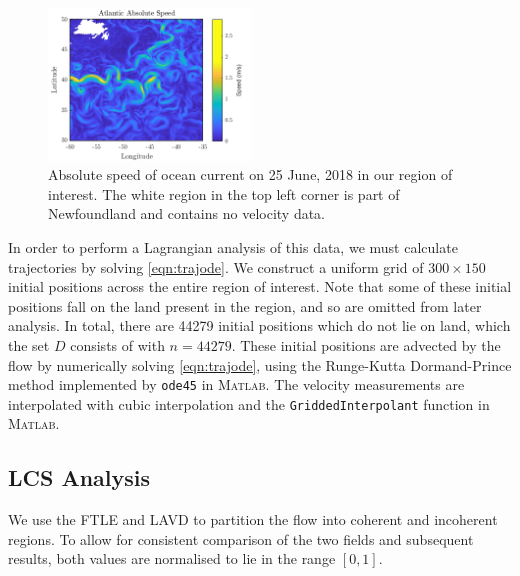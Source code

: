 \documentclass[a4paper, fontsize=12pt]{article}
\begin{document}
\clearpage
\begin{figure}
\begin{center}
	\includegraphics[width=0.48\textwidth]{../figures/atlantic_speed_ff.png}%
	\caption{Absolute speed of ocean current on 25 June, 2018 in our region of interest. The white region in the top left corner is part of Newfoundland and contains no velocity data.}
	\label{fig:atlantic_abs}
\end{center}
\end{figure}

In order to perform a Lagrangian analysis of this data, we must calculate trajectories by solving \eqref{eqn:trajode}. We construct a uniform grid of \(300\times 150\) initial positions across the entire region of interest. Note that some of these initial positions fall on the land present in the region, and so are omitted from later analysis. In total, there are 44279 initial positions which do not lie on land, which the set \(D\) consists of with \(n = 44279\). These initial positions are advected by the flow by numerically solving \eqref{eqn:trajode}, using the Runge-Kutta Dormand-Prince method implemented by \verb|ode45| in \textsc{Matlab}.  The velocity measurements are interpolated with cubic interpolation and the \verb|GriddedInterpolant| function in \textsc{Matlab}.


\subsection{LCS Analysis}
We use the FTLE and LAVD to partition the flow into coherent and incoherent regions. To allow for consistent comparison of the two fields and subsequent results, both values are normalised to lie in the range \([0,1]\).
 
\end{document}
